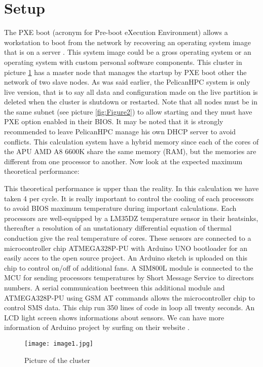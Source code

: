 \documentclass[11pt,a4paper]{article}
\begin{document}
\section{Setup}
\noindent
The PXE boot (acronym for Pre-boot eXecution Environment) allows a workstation to boot from the network by recovering an operating system image that is on a server \cite{tuto1}. This system image could be a gross operating system or an operating system with custom personal software components. This cluster in picture \ref{fig:Figure1} has a master node that manages the startup by PXE boot other the network of two slave nodes. As was said earlier, the PelicanHPC system is only live version, that is to say all data and configuration made on the live partition is deleted when the cluster is shutdown or restarted. Note that all nodes must be in the same subnet (see picture \ref{fig:Figure2}) to allow starting and they must have PXE option enabled in their BIOS. It may be noted that it is strongly recommended to leave PelicanHPC manage his own DHCP server to avoid conflicts. This calculation system have a hybrid memory since each of the cores of the APU AMD A8 6600K share the same memory (RAM), but the memories are different from one processor to another. Now look at the expected maximum theoretical performance:



\noindent
This theoretical performance is upper than the reality. In this calculation we have taken 4  per cycle. It is really important to control the cooling of each processors to avoid BIOS maximum temperature during important calculations. Each processors are well-equipped by a LM35DZ temperature sensor in their heatsinks, thereafter a resolution of an unstationary differential equation of thermal conduction give the real temperature of cores. These sensors are connected to a microcontroller chip ATMEGA328P-PU with Arduino UNO bootloader for an easily acces to the open source project. An Arduino sketch is uploaded on this chip to control on/off of additional fans. A SIM800L module is connected to the MCU for sending processors temperatures by Short Message Service to directors numbers. A serial communication beetween this additional module and ATMEGA328P-PU using GSM AT commands allows the microcontroller chip to control SMS data. This chip run 350 lines of code in loop all twenty seconds. An LCD light screen shows informations about sensors. We can have more information of Arduino project by surfing on their website \cite{arduino}.

\begin{figure}[!htb]
\centering
\texttt{[image: image1.jpg]}
\caption{Picture of the cluster}
\label{fig:Figure1}
\end{figure}
\end{document}
